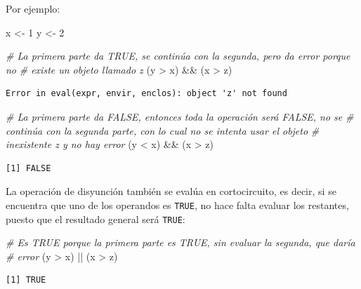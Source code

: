 \documentclass[
]{book}
\newenvironment{Shaded}{\begin{snugshade}}{\end{snugshade}}
\newcommand{\CommentTok}[1]{\textcolor[rgb]{0.56,0.35,0.01}{\textit{#1}}}
\newcommand{\DecValTok}[1]{\textcolor[rgb]{0.00,0.00,0.81}{#1}}
\newcommand{\NormalTok}[1]{#1}
\newcommand{\OtherTok}[1]{\textcolor[rgb]{0.56,0.35,0.01}{#1}}
\newcommand{\SpecialCharTok}[1]{\textcolor[rgb]{0.00,0.00,0.00}{#1}}
\begin{document}
Por ejemplo:

\begin{Shaded}
\begin{Highlighting}[]
\NormalTok{x }\OtherTok{\textless{}{-}} \DecValTok{1}
\NormalTok{y }\OtherTok{\textless{}{-}} \DecValTok{2}

\CommentTok{\# La primera parte da TRUE, se continúa con la segunda, pero da error porque no}
\CommentTok{\# existe un objeto llamado z}
\NormalTok{(y }\SpecialCharTok{\textgreater{}}\NormalTok{ x) }\SpecialCharTok{\&\&}\NormalTok{ (x }\SpecialCharTok{\textgreater{}}\NormalTok{ z)}
\end{Highlighting}
\end{Shaded}

\begin{verbatim}
Error in eval(expr, envir, enclos): object 'z' not found
\end{verbatim}

\begin{Shaded}
\begin{Highlighting}[]
\CommentTok{\# La primera parte da FALSE, entonces toda la operación será FALSE, no se}
\CommentTok{\# continúa con la segunda parte, con lo cual no se intenta usar el objeto}
\CommentTok{\# inexistente z y no hay error}
\NormalTok{(y }\SpecialCharTok{\textless{}}\NormalTok{ x) }\SpecialCharTok{\&\&}\NormalTok{ (x }\SpecialCharTok{\textgreater{}}\NormalTok{ z)}
\end{Highlighting}
\end{Shaded}

\begin{verbatim}
[1] FALSE
\end{verbatim}

La operación de disyunción también se evalúa en cortocircuito, es decir, si se encuentra que uno de los operandos es \texttt{TRUE}, no hace falta evaluar los restantes, puesto que el resultado general será \texttt{TRUE}:

\begin{Shaded}
\begin{Highlighting}[]
\CommentTok{\# Es TRUE porque la primera parte es TRUE, sin evaluar la segunda, que daría}
\CommentTok{\# error}
\NormalTok{(y }\SpecialCharTok{\textgreater{}}\NormalTok{ x) }\SpecialCharTok{||}\NormalTok{ (x }\SpecialCharTok{\textgreater{}}\NormalTok{ z)}
\end{Highlighting}
\end{Shaded}

\begin{verbatim}
[1] TRUE
\end{verbatim}
\end{document}

